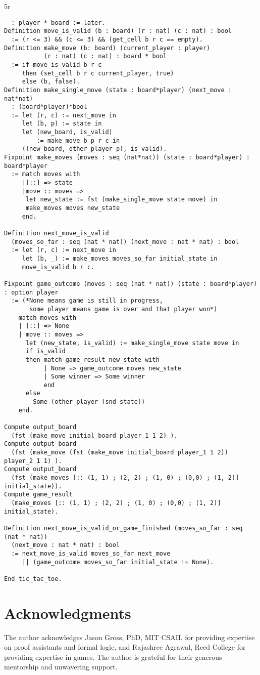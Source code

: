 5r\documentclass{article}
\theoremstyle{definition}
\begin{document}
\begin{verbatim}
  : player * board := later.
Definition move_is_valid (b : board) (r : nat) (c : nat) : bool 
  := (r <= 3) && (c <= 3) && (get_cell b r c == empty).
Definition make_move (b: board) (current_player : player) 
           (r : nat) (c : nat) : board * bool 
  := if move_is_valid b r c
     then (set_cell b r c current_player, true)
     else (b, false).
Definition make_single_move (state : board*player) (next_move : nat*nat)
  : (board*player)*bool 
  := let (r, c) := next_move in
     let (b, p) := state in 
     let (new_board, is_valid) 
         := make_move b p r c in 
     ((new_board, other_player p), is_valid).
Fixpoint make_moves (moves : seq (nat*nat)) (state : board*player) : board*player 
  := match moves with
     |[::] => state
     |move :: moves =>
      let new_state := fst (make_single_move state move) in
      make_moves moves new_state
     end.

Definition next_move_is_valid
  (moves_so_far : seq (nat * nat)) (next_move : nat * nat) : bool 
  := let (r, c) := next_move in 
     let (b, _) := make_moves moves_so_far initial_state in 
     move_is_valid b r c.

Fixpoint game_outcome (moves : seq (nat * nat)) (state : board*player) : option player 
  := (*None means game is still in progress,
       some player means game is over and that player won*)
    match moves with 
    | [::] => None 
    | move :: moves =>
      let (new_state, is_valid) := make_single_move state move in 
      if is_valid 
      then match game_result new_state with 
           | None => game_outcome moves new_state
           | Some winner => Some winner
           end
      else
        Some (other_player (snd state)) 
    end.

Compute output_board 
  (fst (make_move initial_board player_1 1 2) ).
Compute output_board
  (fst (make_move (fst (make_move initial_board player_1 1 2)) player_2 1 1) ).
Compute output_board
  (fst (make_moves [:: (1, 1) ; (2, 2) ; (1, 0) ; (0,0) ; (1, 2)] initial_state)).
Compute game_result
  (make_moves [:: (1, 1) ; (2, 2) ; (1, 0) ; (0,0) ; (1, 2)] initial_state).

Definition next_move_is_valid_or_game_finished (moves_so_far : seq (nat * nat))
  (next_move : nat * nat) : bool 
  := next_move_is_valid moves_so_far next_move
     || (game_outcome moves_so_far initial_state != None).

End tic_tac_toe.
\end{verbatim}

\section{Acknowledgments}
The author acknowledges Jason Gross, PhD, MIT CSAIL for providing expertise on proof assistants and formal logic, and Rajashree Agrawal, Reed College for providing expertise in games. The author is grateful for their generous mentorship and unwavering support.


\nocite{*}
\printbibliography[title={Bibliography},heading=bibnumbered]
\end{document}
